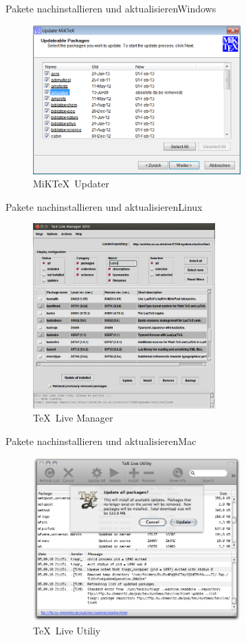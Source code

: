 \begin{Frame}{Pakete nachinstallieren und aktualisieren}{Windows}
  \begin{figure}
    \centering
    \includegraphics[width=8cm]{images/miktex-update}
    \caption{MiK\TeX\ Updater}
  \end{figure}
\end{Frame}

\begin{Frame}{Pakete nachinstallieren und aktualisieren}{Linux}
  \begin{figure}
    \centering
    \includegraphics[width=7cm]{images/texlive-update}
    \caption{\TeX\ Live Manager}
  \end{figure}
\end{Frame}

\begin{Frame}{Pakete nachinstallieren und aktualisieren}{Mac}
  \begin{figure}
    \centering
    \includegraphics[width=8cm]{images/mactex-update}
    \caption{\TeX\ Live Utiliy}
  \end{figure}
\end{Frame}


